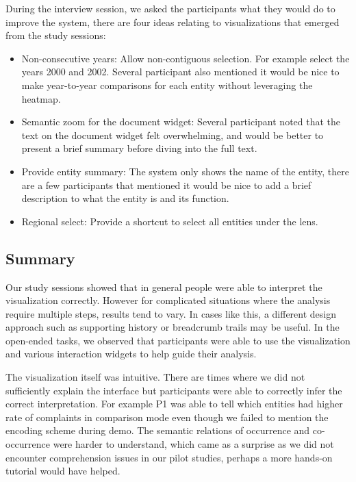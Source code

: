 During the interview session, we asked the participants what they would do to
improve the system, there are four ideas relating to visualizations that emerged
from the study sessions:
\begin{itemize}[noitemsep]
  \item Non-consecutive years: Allow non-contiguous selection. For
  example select the years 2000 and 2002. Several participant also mentioned it
  would be nice to make year-to-year comparisons for each entity without
  leveraging the heatmap.
  
  \item Semantic zoom for the document widget: Several participant noted that
  the text on the document widget felt overwhelming, and would be better to
  present a brief summary before diving into the full text.
  
  \item Provide entity summary: The system only shows the name of the entity,
  there are a few participants that mentioned it would be nice to add a brief
  description to what the entity is and its function.
  
  \item Regional select: Provide a shortcut to select all entities under the
  lens.
\end{itemize}
   
  
\subsection{Summary}
Our study sessions showed that in general people were able to interpret the
visualization correctly. However for complicated situations where the analysis
require multiple steps, results tend to vary. In cases like this, a different
design approach such as supporting history or breadcrumb trails may be useful.
In the open-ended tasks, we observed that participants were able to use the
visualization and various interaction widgets to help guide their analysis.

The \threed visualization itself was intuitive. There are times where we did not
sufficiently explain the interface but participants were able to correctly infer
the correct interpretation. For example P1 was able to tell which entities had higher rate
of complaints in comparison mode even though we failed to mention the encoding scheme during demo. 
The semantic relations of occurrence and co-occurrence were harder to understand, which 
came as a surprise as we did not encounter comprehension issues in our pilot studies, 
perhaps a more hands-on tutorial would have helped.

